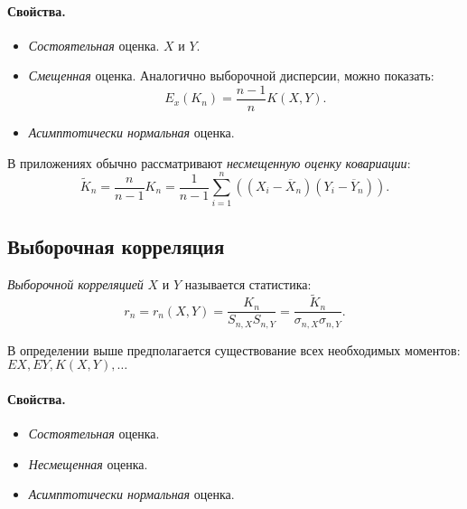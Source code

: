 \paragraph{Свойства.}
\begin{itemize}
  \item \textit{Состоятельная} оценка.
  $X$ и $Y$.
  \item \textit{Смещенная} оценка. Аналогично выборочной дисперсии, можно
  показать:
  \[
    E_x(K_n) = \frac{n - 1}{n} K(X, Y)
  .\]
  \item \textit{Асимптотически нормальная} оценка.
\end{itemize}

\begin{definition}
  В приложениях обычно рассматривают \textit{несмещенную оценку ковариации}:
  \[
    \widetilde{K}_n = \frac{n}{n - 1} K_n =
     \frac{1}{n - 1} \sum\limits_{i = 1}^{n}
     ((X_i - \overline{X}_n) (Y_i - \overline{Y}_n))
  .\]
\end{definition}

\subsection{Выборочная корреляция}

\begin{definition}
  \textit{Выборочной корреляцией} $X$ и $Y$ называется статистика:
  \[
    r_n = r_n(X, Y) = \frac{K_n}{S_{n, X} S_{n, Y}} =
    \frac{\widetilde{K}_n}{\sigma_{n, X} \sigma_{n, Y}}
  .\]
\end{definition}

\begin{remark}
  В определении выше предполагается существование всех необходимых моментов:
  $EX, EY, K(X, Y), \ldots$
\end{remark}

\paragraph{Свойства.}
\begin{itemize}
  \item \textit{Состоятельная} оценка.
  \item \textit{Несмещенная} оценка.
  \item \textit{Асимптотически нормальная} оценка.
\end{itemize}
